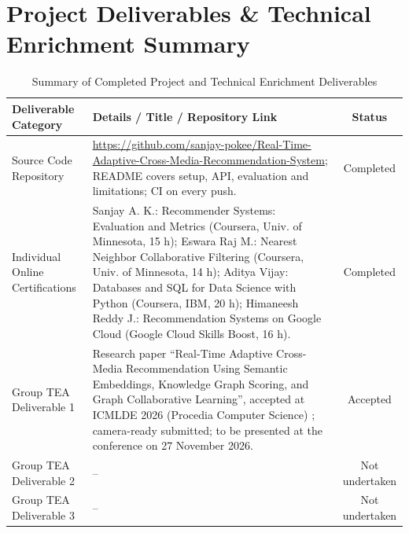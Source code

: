 \documentclass[11pt, a4paper]{article}
\begin{document}
\section{Project Deliverables \& Technical Enrichment Summary}
\begin{table}[H]
    \centering
    \footnotesize
    \renewcommand{\arraystretch}{1.2}
    \begin{tabular}{|L{4.2cm}|L{9.4cm}|c|}
        \hline
        \textbf{Deliverable Category} & \textbf{Details / Title / Repository Link} & \textbf{Status} \\
        \hline
        Source Code Repository & \url{https://github.com/sanjay-pokee/Real-Time-Adaptive-Cross-Media-Recommendation-System}; README covers setup, API, evaluation and limitations; CI on every push. & Completed \\
        \hline
        Individual Online Certifications & Sanjay A. K.: Recommender Systems: Evaluation and Metrics (Coursera, Univ. of Minnesota, 15 h); Eswara Raj M.: Nearest Neighbor Collaborative Filtering (Coursera, Univ. of Minnesota, 14 h); Aditya Vijay: Databases and SQL for Data Science with Python (Coursera, IBM, 20 h); Himaneesh Reddy J.: Recommendation Systems on Google Cloud (Google Cloud Skills Boost, 16 h). & Completed \\
        \hline
        Group TEA Deliverable 1 & Research paper ``Real-Time Adaptive Cross-Media Recommendation Using Semantic Embeddings, Knowledge Graph Scoring, and Graph Collaborative Learning'', accepted at ICMLDE 2026 (Procedia Computer Science) \cite{ak2026crossmedia}; camera-ready submitted; to be presented at the conference on 27 November 2026. & Accepted \\
        \hline
        Group TEA Deliverable 2 & -- & Not undertaken \\
        \hline
        Group TEA Deliverable 3 & -- & Not undertaken \\
        \hline
    \end{tabular}
    \caption{Summary of Completed Project and Technical Enrichment Deliverables}
\end{table}

\vspace{0.2cm}
\nocite{*}
\renewcommand{\refname}{\large\bfseries\color{amritaMaroon}References}


\end{document}
